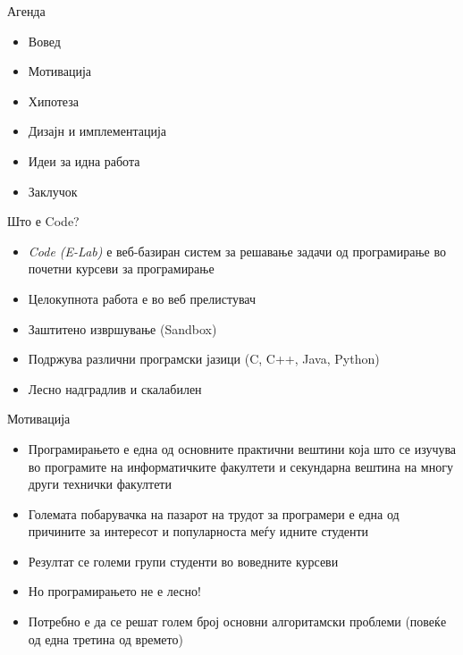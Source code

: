 
\begin{frame}{Агенда}
	\begin{itemize}
	  \item Вовед
	  \item Мотивација
	  \item Хипотеза
	  \item Дизајн и имплементација
	  \item Идеи за идна работа
	  \item Заклучок
	\end{itemize}
\end{frame}

\begin{frame}{Што е Code?}
	\begin{itemize}
	  \item \emph{Code (E-Lab)} е веб-базиран систем за решавање задачи од
	  програмирање во почетни курсеви за програмирање
	  \item Целокупнота работа е во веб прелистувач
	  \item Заштитено извршување (Sandbox)
	  \item Подржува различни програмски јазици (C, C++, Java, Python)
	  \item Лесно надградлив и скалабилен
	\end{itemize}
\end{frame}

\begin{frame}{Мотивација}
    \begin{itemize}
      \item Програмирањето е една од основните практични вештини која што се
      изучува во програмите на информатичките факултети и секундарна вештина на
      многу други технички факултети
      \item Големата побарувачка на пазарот на трудот за програмери е една од
      причините за интересот и популарноста меѓу идните студенти
      \item Резултат се големи групи студенти во воведните курсеви
      \item Но програмирањето не е лесно!
      \item Потребно е да се решат голем број основни алгоритамски проблеми
      (повеќе од една третина од времето)
    \end{itemize}
\end{frame}


